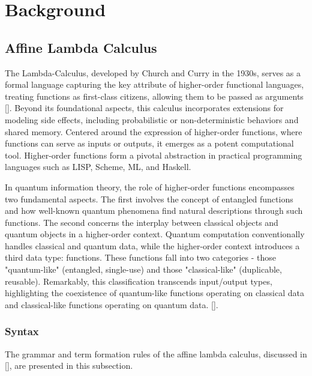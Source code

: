 \chapter{Background}

\section{Affine Lambda Calculus}


The Lambda-Calculus, developed by Church and Curry in the 1930s, serves as a formal language capturing the key attribute of higher-order functional languages, treating functions as first-class citizens, allowing them to be passed as arguments [\cite{barendregt1984lambda}].  Beyond its foundational aspects, this calculus incorporates extensions for modeling side effects, including probabilistic or non-deterministic behaviors and shared memory. Centered around the expression of higher-order functions, where functions can serve as inputs or outputs, it emerges as a potent computational tool.  Higher-order functions form a pivotal abstraction in practical programming languages such as LISP, Scheme, ML, and Haskell.


In quantum information theory, the role of higher-order functions encompasses two fundamental aspects. The first involves the concept of entangled functions and how well-known quantum phenomena find natural descriptions through such functions. The second concerns the interplay between classical objects and quantum objects in a higher-order context. Quantum computation conventionally handles classical and quantum data, while the higher-order context introduces a third data type: functions. These functions fall into two categories - those "quantum-like" (entangled, single-use) and those "classical-like" (duplicable, reusable). Remarkably, this classification transcends input/output types, highlighting the coexistence of quantum-like functions operating on classical data and classical-like functions operating on quantum data. [\cite{selinger2009quantum}].

\subsection{Syntax}
The grammar and term formation rules of the affine lambda calculus, discussed in [\cite{dahlqvist2022syntactic}], are presented in this subsection.

